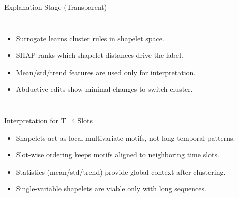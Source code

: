 \documentclass[aspectratio=169]{beamer}
\begin{document}
\begin{frame}{Explanation Stage (Transparent)}
\begin{columns}[T,onlytextwidth]
  \begin{itemize}\footnotesize\setlength\itemsep{4pt}
    \item Surrogate learns cluster rules in shapelet space.
    \item SHAP ranks which shapelet distances drive the label.
    \item Mean/std/trend features are used only for interpretation.
    \item Abductive edits show minimal changes to switch cluster.
  \end{itemize}
\end{columns}
\end{frame}

\begin{frame}{Interpretation for T=4 Slots}
\begin{itemize}\footnotesize\setlength\itemsep{4pt}
  \item Shapelets act as local multivariate motifs, not long temporal patterns.
  \item Slot-wise ordering keeps motifs aligned to neighboring time slots.
  \item Statistics (mean/std/trend) provide global context after clustering.
  \item Single-variable shapelets are viable only with long sequences.
\end{itemize}
\end{frame}
\end{document}
